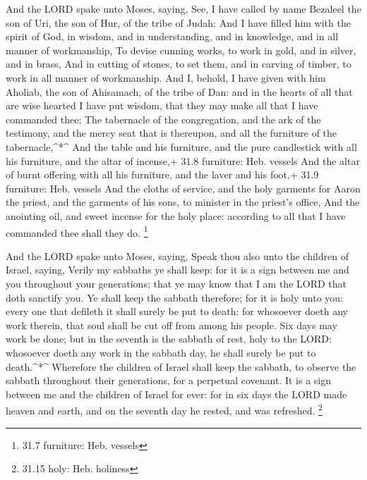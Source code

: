  And the LORD spake unto Moses, saying,  See, I
have called by name Bezaleel the son of Uri, the son of Hur, of the
tribe of Judah:  And I have filled him with the spirit of
God, in wisdom, and in understanding, and in knowledge, and in all
manner of workmanship,  To devise cunning works, to work in
gold, and in silver, and in brass,  And in cutting of
stones, to set them, and in carving of timber, to work in all manner of
workmanship.  And I, behold, I have given with him Aholiab,
the son of Ahisamach, of the tribe of Dan: and in the hearts of all that
are wise hearted I have put wisdom, that they may make all that I have
commanded thee;  The tabernacle of the congregation, and the
ark of the testimony, and the mercy seat that is thereupon, and all the
furniture of the tabernacle,\^{}*\^{}  And the table and his
furniture, and the pure candlestick with all his furniture, and the
altar of incense,+ 31.8 furniture: Heb. vessels  And the
altar of burnt offering with all his furniture, and the laver and his
foot,+ 31.9 furniture: Heb. vessels  And the cloths of
service, and the holy garments for Aaron the priest, and the garments of
his sons, to minister in the priest's office,  And the
anointing oil, and sweet incense for the holy place: according to all
that I have commanded thee shall they do. \footnote{31.7 furniture: Heb.
  vessels}

 And the LORD spake unto Moses, saying,  Speak
thou also unto the children of Israel, saying, Verily my sabbaths ye
shall keep: for it is a sign between me and you throughout your
generations; that ye may know that I am the LORD that doth sanctify you.
 Ye shall keep the sabbath therefore; for it is holy unto
you: every one that defileth it shall surely be put to death: for
whosoever doeth any work therein, that soul shall be cut off from among
his people.  Six days may work be done; but in the seventh
is the sabbath of rest, holy to the LORD: whosoever doeth any work in
the sabbath day, he shall surely be put to death.\^{}*\^{} 
Wherefore the children of Israel shall keep the sabbath, to observe the
sabbath throughout their generations, for a perpetual covenant.
 It is a sign between me and the children of Israel for
ever: for in six days the LORD made heaven and earth, and on the seventh
day he rested, and was refreshed. \footnote{31.15 holy: Heb. holiness}

